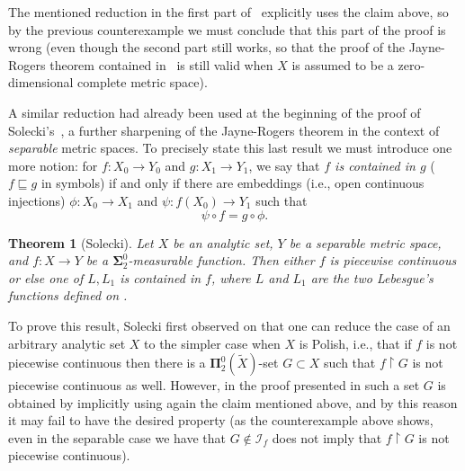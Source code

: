\documentclass{raex}
\theoremstyle{plain}
\newtheorem{thm}{Theorem}
\theoremstyle{definition}
\theoremstyle{remark}
\def\S{\mathbf{\Sigma}}
\def\P{\mathbf{\Pi}}
\def\I{\mathcal{I}}
\begin{document}
The mentioned reduction in the first part of~\cite{mot-sem} explicitly uses the claim above, so by the  previous counterexample  we must conclude that this part of the proof is wrong (even though the second part still works, so that the proof of the Jayne-Rogers theorem contained in~\cite{mot-sem} is still valid when $X$ is assumed to be a zero-dimensional complete metric space). 

A similar reduction had already been used at the beginning of the proof of Solecki's~\cite[Theorem~3.1]{sol}, a further sharpening of the Jayne-Rogers theorem in the context of \emph{separable} metric spaces. To precisely state this last result we must introduce one more notion: for $f \colon X_0 \to Y_0$ and $g \colon X_1 \to Y_1$, we say that \emph{$f$ is contained in $g$} ($f \sqsubseteq g$ in symbols) if and only if there are embeddings (i.e., open continuous injections)  $\phi \colon X_0 \to X_1$ and $\psi \colon f(X_0) \to Y_1$ such that 
\[ \psi \circ f = g \circ \phi. \] 

\begin{thm}[Solecki]\label{theorSolecki}
Let $X$ be an analytic  set, $Y$ be a separable metric space, and $f \colon X \to Y$ be a $\S^0_2$-measurable function. Then either $f$ is piecewise continuous or else one of $L, L_1$ is contained in $f$, where $L$ and $L_1$ are the two Lebesgue's functions defined on \cite[p.~522]{sol}.
\end{thm}

To prove this result, Solecki first observed on \cite[p.~530]{sol} that one can reduce the case of an arbitrary analytic set $X$ to the simpler case when $X$ is Polish, i.e., that if $f $ is not piecewise continuous then there is a $\P^0_2(\widetilde{X})$-set $G\subset X$ such that $f \restriction G$ is not piecewise continuous as well. However, in the proof presented in \cite{sol} such a set $G$ is obtained by implicitly using again the claim mentioned above, and by this reason it may fail to have the desired property (as the counterexample above shows, even in the separable case we have that $G \notin \I_f$ does not imply that $f \restriction G$ is not piecewise continuous). 
\end{document}

